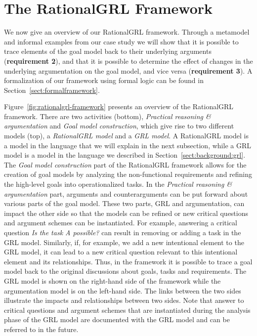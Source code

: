 \section{The RationalGRL Framework}
\label{sect:overview}

We now give an overview of our RationalGRL framework. Through a metamodel and informal examples from our case study we will show that it is possible to trace elements of the goal model back to their underlying arguments (\textbf{requirement 2}), and that it is possible to determine the effect of changes in the underlying argumentation on the goal model, and vice versa (\textbf{requirement 3}). A formalization of our framework using formal logic can be found in Section~\ref{sect:formalframework}.

Figure~\ref{fig:rationalgrl-framework} presents an overview of the RationalGRL framework. There are two activities (bottom), \emph{Practical reasoning \& argumentation} and \emph{Goal model construction}, which give rise to two different models (top), a \emph{RationalGRL model} and a \emph{GRL model}. A RationalGRL model is a model in the language that we will explain in the next subsection, while a GRL model is a model in the language we described in Section~\ref{sect:background:grl}. The \emph{Goal model construction} part of the RationalGRL framework allows for the creation of goal models by analyzing the non-functional requirements and refining the high-level goals into operationalized tasks. In the \emph{Practical reasoning \& argumentation} part, arguments and counterarguments can be put forward about various parts of the goal model. These two parts, GRL and argumentation, can impact the other side so that the models can be refined or new critical questions and argument schemes can be instantiated. For example, answering a critical question \emph{Is the task \emph{A} possible?} can result in removing or adding a task in the GRL model. Similarly, if, for example, we add a new intentional element to the GRL model, it can lead to a new critical question relevant to this intentional element and its relationships. Thus, in the framework it is possible to trace a goal model back to the original discussions about goals, tasks and requirements. The GRL model is shown  on the right-hand side of the framework while the argumentation model is on the left-hand side. The links between the two sides illustrate the impacts and relationships between two sides. Note that answer to critical questions and argument schemes that are instantiated during the analysis phase of the GRL model are documented with the GRL model and can be referred to in the future. 

